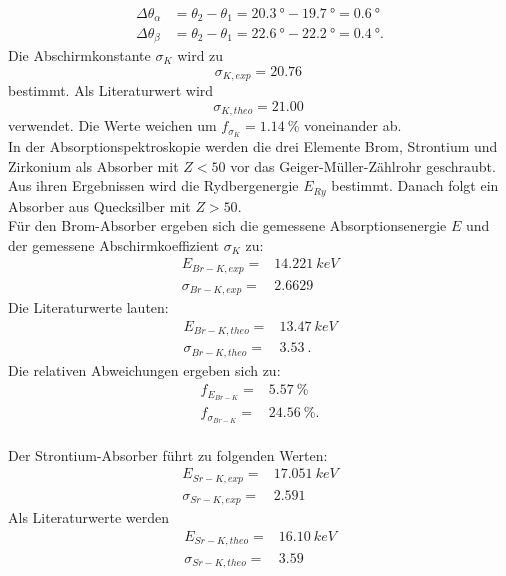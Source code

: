 \begin{align*}
  \Delta \theta_{\alpha} &= \theta_{2}-\theta_{1} = \SI{20.3}{°}-\SI{19.7}{°} = \SI{0.6}{°}\\
  \Delta \theta_{\beta}  &= \theta_{2}-\theta_{1} = \SI{22.6}{°}-\SI{22.2}{°} = \SI{0.4}{°}.
\end{align*}
Die Abschirmkonstante $\sigma_{K}$ wird zu
\begin{equation*}
  \sigma_{K, exp}= \SI{20.76}{}
\end{equation*}
bestimmt.
Als Literaturwert wird
\begin{equation*}
  \sigma_{K, theo}= \SI{21.00}{}
\end{equation*}
verwendet.
Die Werte weichen um $f_{\sigma_{K}}= \SI{1.14}{\%}$ voneinander ab.
\\In der Absorptionspektroskopie werden die drei Elemente Brom, Strontium und Zirkonium als Absorber mit $Z<50$ vor das Geiger-Müller-Zählrohr geschraubt.
Aus ihren Ergebnissen wird die Rydbergenergie $E_{Ry}$ bestimmt.
Danach folgt ein Absorber aus Quecksilber mit $Z>50$.
\\Für den Brom-Absorber ergeben sich die gemessene Absorptionsenergie $E$ und der gemessene Abschirmkoeffizient $\sigma_{K}$ zu:
\begin{align*}
  E_{Br-K, exp}       =& \SI{14.221}{keV} \\
  \sigma_{Br-K, exp}  =& \SI{2.6629}{}
\end{align*}
Die Literaturwerte lauten:
\begin{align*}
  E_{Br-K, theo}      =& \SI{13.47}{keV}\\
  \sigma_{Br-K, theo} =& \SI{3.53}{}.
\end{align*}
Die relativen Abweichungen ergeben sich zu:
\begin{align*}
  f_{E_{Br-K}}      =&  \SI{5.57}{\%}\\
  f_{\sigma_{Br-K}} =&  \SI{24.56}{\%}.
\end{align*}
\\Der Strontium-Absorber führt zu folgenden Werten:
\begin{align*}
  E_{Sr-K, exp}       =& \SI{17.051}{keV} \\
  \sigma_{Sr-K, exp}  =& \SI{2.591}{}
\end{align*}
Als Literaturwerte werden
\begin{align*}
  E_{Sr-K, theo}      =& \SI{16.10}{keV}\\
  \sigma_{Sr-K, theo} =& \SI{3.59}{}
\end{align*}
